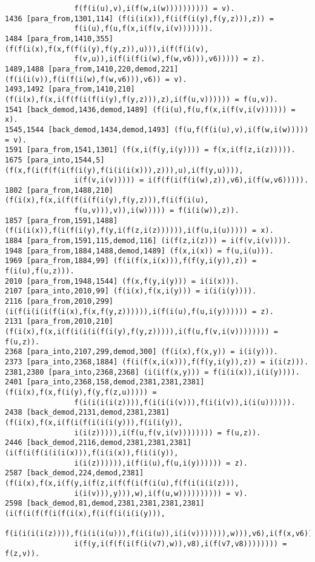 {\begin{verbatim}
                f(f(i(u),v),i(f(w,i(w)))))))))) = v).
1436 [para_from,1301,114] (f(i(i(x)),f(i(f(i(y),f(y,z))),z)) = 
                f(i(u),f(u,f(x,i(f(v,i(v))))))).
1484 [para_from,1410,355] (f(f(i(x),f(x,f(f(i(y),f(y,z)),u))),i(f(f(i(v),
                f(v,u)),i(f(i(f(i(w),f(w,v6))),v6))))) = z).
1489,1488 [para_from,1410,220,demod,221] (f(i(i(v)),f(i(f(i(w),f(w,v6))),v6)) = v).
1493,1492 [para_from,1410,210] (f(i(x),f(x,i(f(f(i(f(i(y),f(y,z))),z),i(f(u,v)))))) = f(u,v)).
1541 [back_demod,1436,demod,1489] (f(i(u),f(u,f(x,i(f(v,i(v)))))) = x).
1545,1544 [back_demod,1434,demod,1493] (f(u,f(f(i(u),v),i(f(w,i(w))))) = v).
1591 [para_from,1541,1301] (f(x,i(f(y,i(y)))) = f(x,i(f(z,i(z))))).
1675 [para_into,1544,5] (f(x,f(i(f(f(i(f(i(y),f(i(i(i(x))),z))),u),i(f(y,u)))),
                i(f(v,i(v))))) = i(f(f(i(f(i(w),z)),v6),i(f(w,v6))))).
1802 [para_from,1488,210] (f(i(x),f(x,i(f(f(i(f(i(y),f(y,z))),f(i(f(i(u),
                f(u,v))),v)),i(w))))) = f(i(i(w)),z)).
1857 [para_from,1591,1488] (f(i(i(x)),f(i(f(i(y),f(y,i(f(z,i(z)))))),i(f(u,i(u))))) = x).
1884 [para_from,1591,115,demod,116] (i(f(z,i(z))) = i(f(v,i(v)))).
1948 [para_from,1884,1488,demod,1489] (f(x,i(x)) = f(u,i(u))).
1969 [para_from,1884,99] (f(i(f(x,i(x))),f(f(y,i(y)),z)) = f(i(u),f(u,z))).
2010 [para_from,1948,1544] (f(x,f(y,i(y))) = i(i(x))).
2107 [para_into,2010,99] (f(i(x),f(x,i(y))) = i(i(i(y)))).
2116 [para_from,2010,299] (i(f(i(i(i(f(i(x),f(x,f(y,z)))))),i(f(i(u),f(u,i(y)))))) = z).
2131 [para_from,2010,210] (f(i(x),f(x,i(f(i(i(i(f(i(y),f(y,z))))),i(f(u,f(v,i(v)))))))) = f(u,z)).
2368 [para_into,2107,299,demod,300] (f(i(x),f(x,y)) = i(i(y))).
2373 [para_into,2368,1884] (f(i(f(x,i(x))),f(f(y,i(y)),z)) = i(i(z))).
2381,2380 [para_into,2368,2368] (i(i(f(x,y))) = f(i(i(x)),i(i(y)))).
2401 [para_into,2368,158,demod,2381,2381,2381] (f(i(x),f(x,f(i(y),f(y,f(z,u))))) = 
                f(i(i(i(i(z)))),f(i(i(i(v))),f(i(i(v)),i(i(u)))))).
2438 [back_demod,2131,demod,2381,2381] (f(i(x),f(x,i(f(i(f(i(i(i(y))),f(i(i(y)),
                i(i(z))))),i(f(u,f(v,i(v)))))))) = f(u,z)).
2446 [back_demod,2116,demod,2381,2381,2381] (i(f(i(f(i(i(i(x))),f(i(i(x)),f(i(i(y)),
                i(i(z)))))),i(f(i(u),f(u,i(y)))))) = z).
2587 [back_demod,224,demod,2381] (f(i(x),f(x,i(f(y,i(f(z,i(f(f(i(f(i(u),f(f(i(i(i(z))),
                i(i(v))),y))),w),i(f(u,w)))))))))) = v).
2598 [back_demod,81,demod,2381,2381,2381,2381] (i(f(i(f(f(i(f(i(x),f(i(f(i(i(i(y))),
                f(i(i(i(i(z)))),f(i(i(i(u))),f(i(i(u)),i(i(v))))))),w))),v6),i(f(x,v6)))),
                i(f(y,i(f(f(i(f(i(v7),w)),v8),i(f(v7,v8)))))))) = f(z,v)).

\end{verbatim}}
